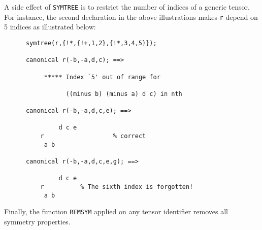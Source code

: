 A side effect of \texttt{SYMTREE} is to restrict the number of indices of 
a generic tensor. For instance, the second declaration in the above 
illustrations makes \texttt{r} depend on 5 indices as illustrated below:
\begin{verbatim}
      symtree(r,{!*,{!+,1,2},{!*,3,4,5}});

      canonical r(-b,-a,d,c); ==> 

           ***** Index `5' out of range for 

                 ((minus b) (minus a) d c) in nth

      canonical r(-b,-a,d,c,e); ==>

               d c e
          r                   % correct
           a b

      canonical r(-b,-a,d,c,e,g); ==>

               d c e
          r          % The sixth index is forgotten!
           a b
\end{verbatim}
Finally, the function \texttt{REMSYM} applied on any tensor
identifier removes all symmetry properties.

